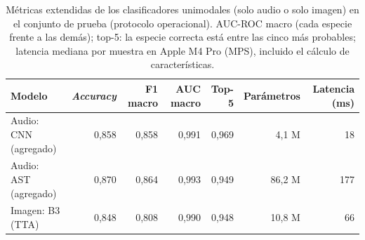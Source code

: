 \begin{table}[!htb]
  \centering\small
  \caption{Métricas extendidas de los clasificadores unimodales (solo audio o solo imagen) en el conjunto de prueba (protocolo operacional). AUC-ROC macro (cada especie frente a las demás); top-5: la especie correcta está entre las cinco más probables; latencia mediana por muestra en Apple M4 Pro (MPS), incluido el cálculo de características.}
  \label{tab:eval-extended}
  \footnotesize\setlength{\tabcolsep}{4pt}
  \begin{tabular}{@{}l r r r r r r@{}}
    \toprule
    Modelo & \textit{Accuracy} & F1 macro & AUC macro & Top-5 & Parámetros & Latencia (ms) \\
    \midrule
    Audio: CNN (agregado) & 0,858 & 0,858 & 0,991 & 0,969 & 4,1 M & 18 \\
    Audio: AST (agregado) & 0,870 & 0,864 & 0,993 & 0,949 & 86,2 M & 177 \\
    Imagen: B3 (TTA) & 0,848 & 0,808 & 0,990 & 0,948 & 10,8 M & 66 \\
    \bottomrule
  \end{tabular}
\end{table}
